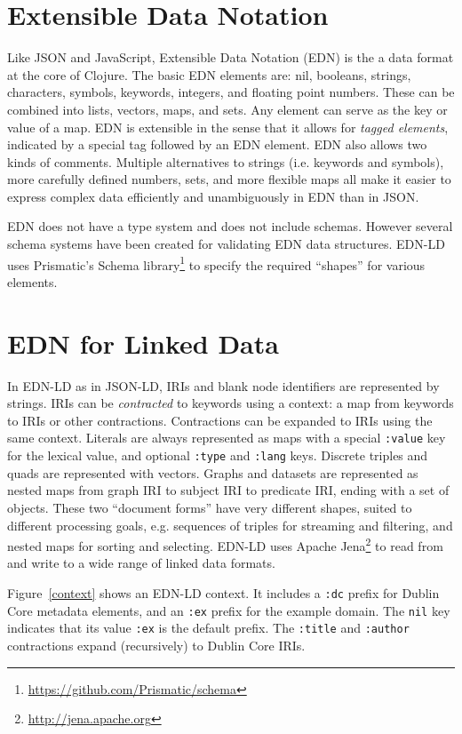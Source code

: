 \documentclass{icbo}
\begin{document}
\section{Extensible Data Notation}

Like JSON and JavaScript, Extensible Data Notation (EDN) is the a data format at the core of Clojure. The basic EDN elements are: nil, booleans, strings, characters, symbols, keywords, integers, and floating point numbers. These can be combined into lists, vectors, maps, and sets. Any element can serve as the key or value of a map. EDN is extensible in the sense that it allows for {\it tagged elements}, indicated by a special tag followed by an EDN element. EDN also allows two kinds of comments. Multiple alternatives to strings (i.e. keywords and symbols), more carefully defined numbers, sets, and more flexible maps all make it easier to express complex data efficiently and unambiguously in EDN than in JSON.

EDN does not have a type system and does not include schemas. However several schema systems have been created for validating EDN data structures. EDN-LD uses Prismatic's Schema library\footnote{\url{https://github.com/Prismatic/schema}} to specify the required ``shapes'' for various elements.


\section{EDN for Linked Data}

In EDN-LD as in JSON-LD, IRIs and blank node identifiers are represented by strings. IRIs can be {\it contracted} to keywords using a context: a map from keywords to IRIs or other contractions. Contractions can be expanded to IRIs using the same context. Literals are always represented as maps with a special {\tt :value} key for the lexical value, and optional {\tt :type} and {\tt :lang} keys. Discrete triples and quads are represented with vectors. Graphs and datasets are represented as nested maps from graph IRI to subject IRI to predicate IRI, ending with a set of objects. These two ``document forms'' have very different shapes, suited to different processing goals, e.g. sequences of triples for streaming and filtering, and nested maps for sorting and selecting. EDN-LD uses Apache Jena\footnote{\url{http://jena.apache.org}} to read from and write to a wide range of linked data formats.

Figure~\ref{context} shows an EDN-LD context. It includes a {\tt :dc} prefix for Dublin Core metadata elements, and an {\tt :ex} prefix for the example domain. The {\tt nil} key indicates that its value {\tt :ex} is the default prefix. The {\tt :title} and {\tt :author} contractions expand (recursively) to Dublin Core IRIs.
\end{document}
